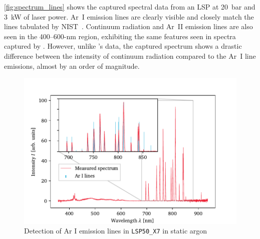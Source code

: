         \autoref{fig:spectrum_lines} shows the captured spectral data from an LSP at \qty{20}{bar} and \qty{3}{kW} of laser power. Ar~I emission lines are clearly visible and closely match the lines tabulated by NIST~\cite{kramidaNISTAtomicSpectra2022}. Continuum radiation and Ar~II emission lines are also seen in the 400--600-nm region, exhibiting the same features seen in spectra captured by \textcite{luCharacteristicDiagnosticsLaserStabilized2022}. However, unlike \citeauthor{luCharacteristicDiagnosticsLaserStabilized2022}'s data, the captured spectrum shows a drastic difference between the intensity of continuum radiation compared to the Ar~I line emissions, almost by an order of magnitude. 

        \begin{figure}[h]
            \centering
            \includegraphics[]{assets/5 results/spectrum_LSP50_X7_lines}
            \caption{Detection of Ar I emission lines in \texttt{LSP50\_X7} in static argon}
            \label{fig:spectrum_lines}
        \end{figure}

